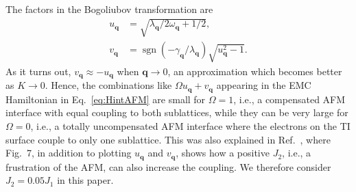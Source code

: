 \documentclass[aps, prb, twocolumn,amsmath,amssymb,floatfix]{revtex4-2}
\begin{document}


The factors in the Bogoliubov transformation are 
\begin{align}
\label{eq:Bogoliubov_u}
    u_{\boldsymbol{q}} &= \sqrt{\lambda_{\boldsymbol{q}}/2\omega_{\boldsymbol{q}}+1/2}, \\
    v_{\boldsymbol{q}} &= \operatorname{sgn}(-\gamma_{\boldsymbol{q}}/\lambda_{\boldsymbol{q}})\sqrt{u_{\boldsymbol{q}}^2-1}. \label{eq:Bogoliubov_v}
\end{align}
As it turns out, $v_{\boldsymbol{q}} \approx -u_{\boldsymbol{q}}$ when $\boldsymbol{q} \to 0$, an approximation which becomes better as $K \to 0$. Hence, the combinations like $\Omega u_{\boldsymbol{q}} + v_{\boldsymbol{q}}$ appearing in the EMC Hamiltonian in Eq.~\eqref{eq:HintAFM} are small for $\Omega = 1$, i.e., a compensated AFM interface with equal coupling to both sublattices, while they can be very large for $\Omega = 0$, i.e., a totally uncompensated AFM interface where the electrons on the TI surface couple to only one sublattice. This was also explained in Ref.~\cite{EirikTIFMAFM}, where Fig.~7, in addition to plotting $u_{\boldsymbol{q}}$ and $v_{\boldsymbol{q}}$, shows how a positive $J_2$, i.e., a frustration of the AFM, can also increase the coupling. We therefore consider $J_2 = 0.05J_1$ in this paper. 
\end{document}
